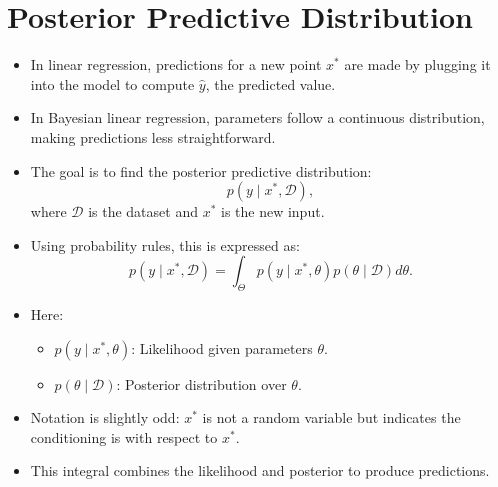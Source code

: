 
\section{Posterior Predictive Distribution}
\begin{itemize}
    \item In linear regression, predictions for a new point \(x^*\) are made by plugging it into the model to compute \(\hat{y}\), the predicted value.
    \item In Bayesian linear regression, parameters follow a continuous distribution, making predictions less straightforward.
    \item The goal is to find the posterior predictive distribution:
          \[
              p(y \mid x^*, \mathcal{D}),
          \]
          where \(\mathcal{D}\) is the dataset and \(x^*\) is the new input.
    \item Using probability rules, this is expressed as:
          \[
              p(y \mid x^*, \mathcal{D}) = \int_{\Theta} p(y \mid x^*, \theta) p(\theta \mid \mathcal{D}) d\theta.
          \]
    \item Here:
          \begin{itemize}
              \item \(p(y \mid x^*, \theta)\): Likelihood given parameters \(\theta\).
              \item \(p(\theta \mid \mathcal{D})\): Posterior distribution over \(\theta\).
          \end{itemize}
    \item Notation is slightly odd: \(x^*\) is not a random variable but indicates the conditioning is with respect to \(x^*\).
    \item This integral combines the likelihood and posterior to produce predictions.
\end{itemize}

